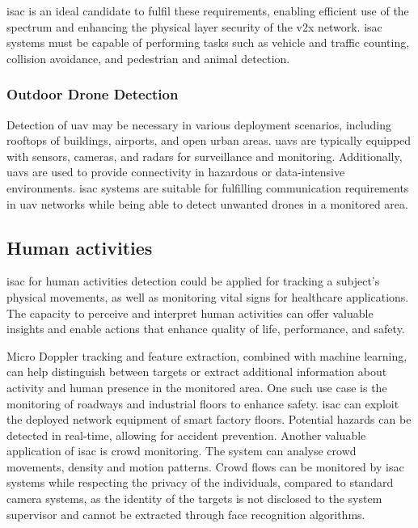 	\gls{isac} is an ideal candidate to fulfil these requirements, enabling efficient use of the spectrum and enhancing the physical layer security of the \gls{v2x} network.
	\gls{isac} systems must be capable of performing tasks such as vehicle and traffic counting, collision avoidance, and pedestrian and animal detection.
	
	\subsubsection{Outdoor Drone Detection}
	
	Detection of \gls{uav} may be necessary in various deployment scenarios, including rooftops of buildings, airports, and open urban areas.
	\glspl{uav} are typically equipped with sensors, cameras, and radars for surveillance and monitoring. Additionally, \glspl{uav} are used to provide connectivity in hazardous or data-intensive environments.
	\gls{isac} systems are suitable for fulfilling communication requirements in \gls{uav} networks while being able to detect unwanted drones in a monitored area.
	
	\subsection{Human activities}
	
	\Gls{isac} for human activities detection could be applied for tracking a subject's physical movements, as well as monitoring vital signs for healthcare applications. 
	The capacity to perceive and interpret human activities can offer valuable insights and enable actions that enhance quality of life, performance, and safety.
	
	Micro Doppler tracking and feature extraction, combined with machine learning, can help distinguish between targets or extract additional information about activity and human presence in the monitored area.	
	One such use case is the monitoring of roadways and industrial floors to enhance safety. \Gls{isac} can exploit the deployed network equipment of smart factory floors. Potential hazards can be detected in real-time, allowing for accident prevention. 
	Another valuable application of \gls{isac} is crowd monitoring. 
	The system can analyse crowd movements, density and motion patterns. 
	Crowd flows can be monitored by \gls{isac} systems while respecting the privacy of the individuals, compared to standard camera systems, as the identity of the targets is not disclosed to the system supervisor and cannot be extracted through face recognition algorithms.

